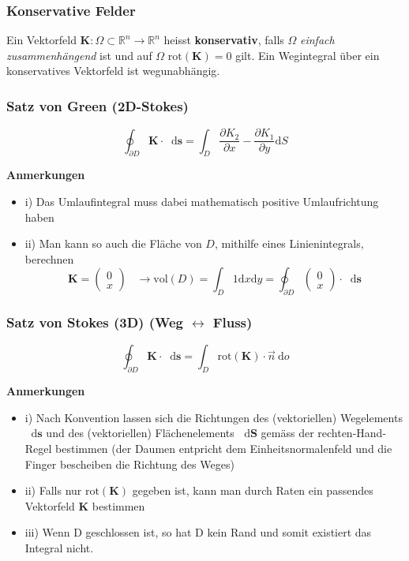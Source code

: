 \documentclass[8pt, a4paper, landscape, fleqn]{scrartcl}
\newenvironment {annotation}[1]
				{\begin{itshape} \begin{small} \textbf{#1} \begin{itemize}}
				{\end{itemize} \end{small} \end{itshape}}
\def\R{\mathbb{R}}
\def\d{\text{d}}
\def\K{\mathbf{K}}
\providecommand{\diff}{\mathop{} \! \mathrm{d}}
\begin{document}
\begin{multicols*}{3}
				\subsubsection{Konservative Felder}
				    Ein Vektorfeld $\K : \Omega \subset \R^n \to \R^n$ heisst \textbf{konservativ}, falls $\Omega$ \textit{einfach zusammenhängend} ist und auf $\Omega \text{ rot}(\K) = 0$ gilt. Ein Wegintegral über ein konservatives Vektorfeld ist wegunabhängig.
					
				\subsubsection{Satz von Green (2D-Stokes) }
					\begin{equation*}
						\oint_{\partial D} \textbf{K} \cdot \diff \textbf{s}=\int_D \frac{\partial K_2}{\partial x}-\frac{\partial K_1}{\partial y} \text{d}S
					\end{equation*}
					\begin{annotation}{Anmerkungen}
						\item[i)] Das Umlaufintegral muss dabei mathematisch positive Umlaufrichtung haben
						\item[ii)] Man kann so auch die Fläche von $D$, mithilfe eines Linienintegrals, berechnen
						\begin{equation*}
							\textbf{K}=
							\begin{pmatrix}
								0\\ x
							\end{pmatrix}
							\hspace{10pt} \rightarrow \text{vol}(D)=\int_D 1 \text{d}x\text{d}y=\oint_{\partial D}
							\begin{pmatrix}
							0\\ x
							\end{pmatrix}
							\cdot \diff \textbf{s}
						\end{equation*}
					\end{annotation}
				\subsubsection{Satz von Stokes (3D) (Weg $\leftrightarrow$ Fluss)}
					\begin{equation*}
						\oint_{\partial D}\textbf{K} \cdot \diff \textbf{s}=\int_D \text{rot}(\textbf{K}) \cdot \vec{n}\ \d o
					\end{equation*}
					\begin{annotation}{Anmerkungen}
						\item[i)] Nach Konvention lassen sich die Richtungen des (vektoriellen) Wegelements $\diff \textbf{s}$ und des (vektoriellen) Flächenelements $\diff \textbf{S}$ gemäss der rechten-Hand-Regel bestimmen (der Daumen entpricht dem Einheitsnormalenfeld und die Finger bescheiben die Richtung des Weges)
						\item[ii)] Falls nur $\text{rot}(\textbf{K})$ gegeben ist, kann man durch Raten ein passendes Vektorfeld $\textbf{K}$ bestimmen
						\item[iii)] Wenn D geschlossen ist, so hat D kein Rand und somit existiert das Integral nicht.
					\end{annotation}

\end{multicols*}
\end{document}
